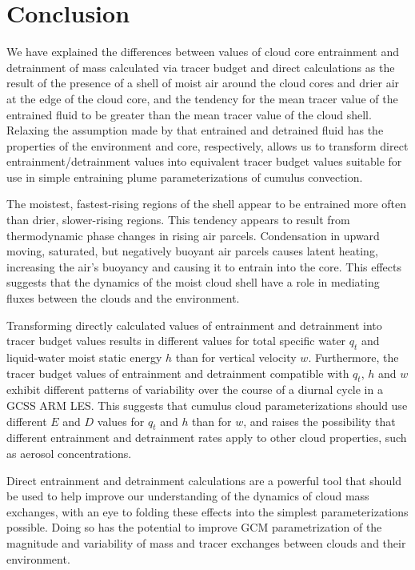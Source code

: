 \documentclass[12pt]{article}
\begin{document}

\section{Conclusion}

We have explained the differences between values of cloud core 
entrainment and detrainment of mass calculated via tracer budget and 
direct calculations as the result of the presence of a shell of moist 
air around the cloud cores and drier air at the edge of the cloud core, 
and the tendency for the mean tracer value of the entrained fluid to be 
greater than the mean tracer value of the cloud shell.  Relaxing the 
assumption made by \cite{Siebesma1995} that entrained and detrained 
fluid has the properties of the environment and core, respectively, 
allows us to transform direct entrainment/detrainment values into 
equivalent tracer budget values suitable for use in simple entraining 
plume parameterizations of cumulus convection.  

The moistest, fastest-rising regions of the shell appear to be entrained 
more often than drier, slower-rising regions.  This tendency appears to 
result from thermodynamic phase changes in rising air parcels. 
Condensation in upward moving, saturated, but negatively buoyant air 
parcels causes latent heating, increasing the air's buoyancy and causing 
it to entrain into the core.  This effects suggests that the dynamics of 
the moist cloud shell have a role in mediating fluxes between the clouds 
and the environment.

Transforming directly calculated values of entrainment and detrainment 
into tracer budget values results in different values for total specific
water $q_t$ and liquid-water moist static energy $h$ than for vertical 
velocity $w$.  Furthermore, the tracer budget values of entrainment
and detrainment compatible with $q_t$, $h$ and $w$ exhibit different 
patterns of variability over the course of a diurnal cycle in a GCSS ARM 
LES.  This suggests that cumulus cloud parameterizations should use 
different $E$ and $D$ values for $q_t$ and $h$ than for $w$, and raises
the possibility that different entrainment and detrainment rates apply to
other cloud properties, such as aerosol concentrations.

Direct entrainment and detrainment calculations are a powerful tool 
that should be used to help improve our understanding of the dynamics of 
cloud mass exchanges, with an eye to folding these effects into the 
simplest parameterizations possible. Doing so has the potential to 
improve GCM parametrization of the magnitude and variability of mass and 
tracer exchanges between clouds and their environment.
\end{document}
